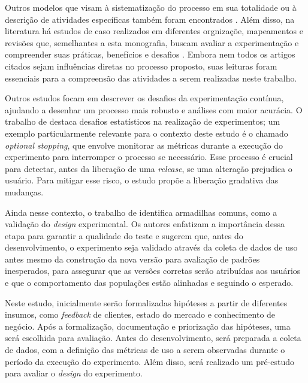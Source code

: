 Outros modelos que visam à sistematização do processo em sua totalidade ou à descrição de atividades específicas também foram encontrados \cite{fagerholm_right_2017, issa_mattos_hurrier_2023, olsson_opinions_2014}. Além disso, na literatura há estudos de caso realizados em diferentes orgnizaçõe, mapeamentos e revisões que, semelhantes a esta monografia, buscam avaliar a experimentação e compreender suas práticas, benefícios e desafios \cite{kevic_characterizing_2017, kuhrmann_activity_2018, fernandes_hitting_2015, sauvola_towards_2015, issa_mattos_hurrier_2023, kohavi_online_2013, fabijan_benefits_2017, quin_b_2024, erthal_characterization_2023, larsen_statistical_2024}. Embora nem todos os artigos citados sejam influências diretas no processo proposto, suas leituras foram essenciais para a compreensão das atividades a serem realizadas neste trabalho.

Outros estudos focam em descrever os desafios da experimentação contínua, ajudando a desenhar um processo mais robusto e análises com maior acurácia. O trabalho de  destaca desafios estatísticos na realização de experimentos; um exemplo particularmente relevante para o contexto deste estudo é o chamado \textit{optional stopping}, que envolve monitorar as métricas durante a execução do experimento para interromper o processo se necessário. Esse processo é crucial para detectar, antes da liberação de uma \textit{release}, se uma alteração prejudica o usuário. Para mitigar esse risco, o estudo propõe a liberação gradativa das mudanças.

Ainda nesse contexto, o trabalho de  identifica armadilhas comuns, como a validação do \textit{design} experimental. Os autores enfatizam a importância dessa etapa para garantir a qualidade do teste e sugerem que, antes do desenvolvimento, o experimento seja validado através da coleta de dados de uso antes mesmo da construção da nova versão para avaliação de padrões inesperados, para assegurar que as versões corretas serão atribuídas aos usuários e que o comportamento das populações estão alinhadas e seguindo o esperado.

Neste estudo, inicialmente serão formalizadas hipóteses a partir de diferentes insumos, como \textit{feedback} de clientes, estado do mercado e conhecimento de negócio. Após a formalização, documentação e priorização das hipóteses, uma será escolhida para avaliação. Antes do desenvolvimento, será preparada a coleta de dados, com a definição das métricas de uso a serem observadas durante o período da execução do experimento. Além disso, será realizado um pré-estudo para avaliar o \textit{design} do experimento.

